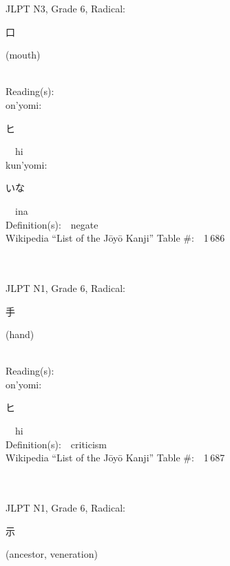 \begin{multicols}{2}
{JLPT N3, Grade 6, Radical:\ \ {\begin{CJK}{UTF8}{min} 口 \end{CJK}} (mouth) } \\
Reading(s):\ \ \\
{\hspace*{1em}}on'yomi:\ \ \\
{\hspace*{2em}}{\begin{CJK}{UTF8}{min} ヒ \end{CJK}}\ \ hi\ \ \\
{\hspace*{1em}}kun'yomi:\ \ \\
{\hspace*{2em}}{\begin{CJK}{UTF8}{min} いな \end{CJK}}\ \ ina\ \ \\
Definition(s):\ \ negate \\
Wikipedia ``List of the J\=oy\=o Kanji'' Table \#:\ \ 1\,686 \\
\ \ \\
{\fontsize{34pt}{40pt}  }\ \ \\  %
{JLPT N1, Grade 6, Radical:\ \ {\begin{CJK}{UTF8}{min} 手 \end{CJK}} (hand) } \\
Reading(s):\ \ \\
{\hspace*{1em}}on'yomi:\ \ \\
{\hspace*{2em}}{\begin{CJK}{UTF8}{min} ヒ \end{CJK}}\ \ hi\ \ \\
Definition(s):\ \ criticism \\
Wikipedia ``List of the J\=oy\=o Kanji'' Table \#:\ \ 1\,687 \\
\ \ \\
{\fontsize{34pt}{40pt}  }\ \ \\  %
{JLPT N1, Grade 6, Radical:\ \ {\begin{CJK}{UTF8}{min} 示 \end{CJK}} (ancestor, veneration) } \\

\end{multicols}

